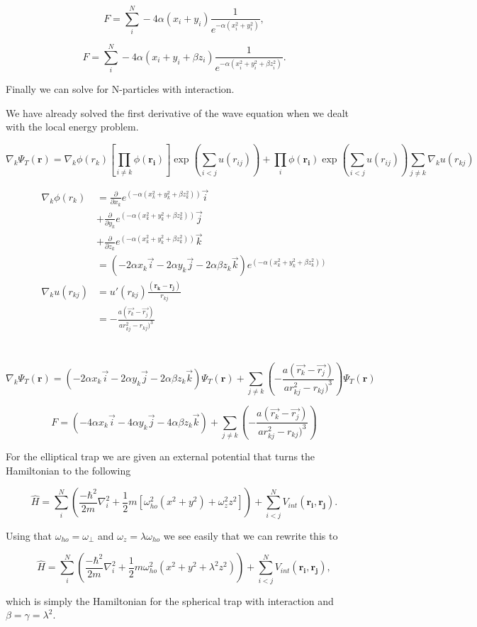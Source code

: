 $$F = \sum_i^N -4\alpha (x_i + y_i) \frac{1}{e^{-\alpha (x_i^2 + y_i^2)}},$$

$$F = \sum_i^N -4\alpha (x_i + y_i + \beta z_i) \frac{1}{e^{-\alpha (x_i^2 + y_i^2 + \beta z_i^2)}}.$$

Finally we can solve for N-particles with interaction.

We have already solved the first derivative of the wave equation when we dealt with the local energy problem.

$$\nabla_k \Psi_T(\mathbf{r}) = \nabla_k \phi(r_k) \left[\prod_{i\ne k} \phi(\mathbf{r_i})\right] \exp \left(\sum_{i<j}u(r_{ij})\right) +  \prod_{i} \phi (\mathbf{r_i}) \exp \left(\sum_{i<j}u(r_{ij})\right) \sum_{j\ne k} \nabla_k u(r_{kj})$$

\begin{align*}
\nabla_k \phi(r_k) &= \frac{\partial}{\partial x_k} e^{(-\alpha (x_k^2 + y_k^2 + \beta z_k^2))} \vec{i} \\
&+ \frac{\partial}{\partial y_k} e^{(-\alpha (x_k^2 + y_k^2 + \beta z_k^2))} \vec{j} \\
&+ \frac{\partial}{\partial z_k} e^{(-\alpha (x_k^2 + y_k^2 + \beta z_k^2))} \vec{k} \\
&= (-2\alpha x_k \vec{i} -2\alpha y_k \vec{j} -2\alpha \beta z_k \vec{k}) e^{(-\alpha (x_k^2 + y_k^2 + \beta z_k^2))}\\
\nabla_k u(r_{kj}) &= u'(r_{kj}) \frac{(\mathbf{r_k} - \mathbf{r_j})}{r_{kj}}\\
&= - \frac{a(\vec{r_k} - \vec{r_j})}{ar_{kj}^2 - r_{kj})^3}
\end{align*}
\\
\\

$$\nabla_k \Psi_T(\mathbf{r}) = (-2\alpha x_k \vec{i} - 2\alpha y_k \vec{j} - 2\alpha \beta z_k \vec{k}) \Psi_T(\mathbf{r})  + \sum_{j \ne k} \left( - \frac{a(\vec{r_k} - \vec{r_j})}{ar_{kj}^2 - r_{kj})^3} \right)\Psi_T(\mathbf{r})$$

$$F = (-4\alpha x_k \vec{i} - 4\alpha y_k \vec{j} - 4\alpha \beta z_k \vec{k}) + \sum_{j \ne k} \left( - \frac{a(\vec{r_k} - \vec{r_j})}{ar_{kj}^2 - r_{kj})^3} \right)$$

For the elliptical trap we are given an external potential that turns the Hamiltonian to the following

$$\hat{H} = \sum_{i}^{N} \left( \frac{-\hbar^2}{2m} \nabla_i^2 + \frac{1}{2} m [\omega_{ho}^2(x^2+ y^2) + \omega_z^2 z^2] \right) + \sum_{i<j}^{N} V_{int}(\mathbf{r_i}, \mathbf{r_j}).$$

Using that $\omega_{ho} = \omega_{\perp}$ and $\omega_z = \lambda \omega_{ho}$ we see easily that we can rewrite this to 

\begin{equation} \label{eq:elliptical}
\hat{H} = \sum_{i}^{N} \left( \frac{-\hbar^2}{2m} \nabla_i^2 + \frac{1}{2} m \omega_{ho}^2(x^2 + y^2 + \lambda^2 z^2) \right) + \sum_{i<j}^{N} V_{int}(\mathbf{r_i}, \mathbf{r_j}),
\end{equation}

which is simply the Hamiltonian for the spherical trap with interaction and $\beta = \gamma = \lambda^2$.

